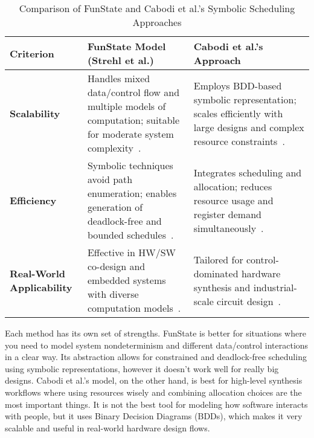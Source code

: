 \documentclass[conference]{IEEEtran}
\begin{document}
\begin{table}[htbp]
\caption{Comparison of FunState and Cabodi et al.’s Symbolic Scheduling Approaches}
\label{tab:comparison}
\renewcommand{\arraystretch}{3}
\setlength{\tabcolsep}{1pt}
\begin{tabularx}{\columnwidth}{|>{\raggedright\arraybackslash}p{2cm}|>{\raggedright\arraybackslash}p{3.4cm}|>{\raggedright\arraybackslash}p{3.2cm}|}
\hline
\textbf{Criterion} & \textbf{FunState Model (Strehl et al.)} & \textbf{Cabodi et al.'s Approach} \\
\hline
\textbf{Scalability} & Handles mixed data/control flow and multiple models of computation; suitable for moderate system complexity~\cite{strehl1999scheduling}. & Employs BDD-based symbolic representation; scales efficiently with large designs and complex resource constraints~\cite{cabodi2002symbolic}. \\
\hline
\textbf{Efficiency} & Symbolic techniques avoid path enumeration; enables generation of deadlock-free and bounded schedules~\cite{strehl1999scheduling}. & Integrates scheduling and allocation; reduces resource usage and register demand simultaneously~\cite{cabodi2002symbolic}. \\
\hline
\textbf{Real-World Applicability} & Effective in HW/SW co-design and embedded systems with diverse computation models~\cite{strehl1999scheduling}. & Tailored for control-dominated hardware synthesis and industrial-scale circuit design~\cite{cabodi2002symbolic}. \\
\hline
\end{tabularx}
\end{table}


Each method has its own set of strengths.  FunState is better for situations where you need to model system nondeterminism and different data/control interactions in a clear way.  Its abstraction allows for constrained and deadlock-free scheduling using symbolic representations, however it doesn't work well for really big designs.  Cabodi et al.'s model, on the other hand, is best for high-level synthesis workflows where using resources wisely and combining allocation choices are the most important things.  It is not the best tool for modeling how software interacts with people, but it uses Binary Decision Diagrams (BDDs), which makes it very scalable and useful in real-world hardware design flows.










\end{document}
